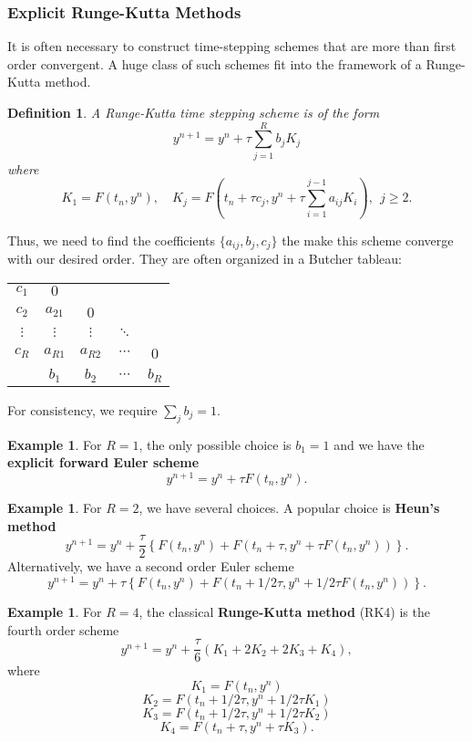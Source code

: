 \documentclass{article}
\newtheorem{definition}[theorem]{Definition}
\theoremstyle{definition}
\newtheorem{example}[theorem]{Example}
\theoremstyle{definition}
\begin{document}
\subsubsection{Explicit Runge-Kutta Methods}
It is often necessary to construct time-stepping schemes that are more than first order convergent. A huge class of such schemes fit into the framework of a Runge-Kutta method.
\begin{definition}
    A Runge-Kutta time stepping scheme is of the form
    $$y^{n+1}=y^n+\tau \sum_{j=1}^{R}b_jK_j$$
    where
    $$K_1=F(t_n,y^n),\quad K_{j}=F\left(t_n+\tau c_j,y^n+\tau\sum_{i=1}^{j-1}a_{ij}K_i\right),\:\:j\geq 2.$$
\end{definition}
Thus, we need to find the coefficients $\{a_{ij},b_j,c_j\}$ the make this scheme converge with our desired order. They are often organized in a Butcher tableau:
\begin{table}[h]
\centering
\begin{tabular}{c|cccc}
$c_1$ & $0$ &  &  &  \\
$c_2$ & $a_{21}$ & 0 &  &  \\
$\vdots$ & $\vdots$ & $\vdots$ & $\ddots$ & \\
$c_R$ & $a_{R1}$ & $a_{R2}$ & $\cdots$ & 0 \\
\hline
      & $b_1$    & $b_2$    & $\cdots$ & $b_R$
\end{tabular}
\end{table}
For consistency, we require $\sum_{j}b_j=1$.
\begin{example}
    For $R=1$, the only possible choice is $b_1=1$ and we have the \textbf{explicit forward Euler scheme}
    $$y^{n+1}=y^n+\tau F(t_n,y^n).$$
\end{example}
\begin{example}
    For $R=2$, we have several choices. A popular choice is \textbf{Heun's method}
    $$y^{n+1}=y^n+\frac{\tau}{2}\left\{F(t_n,y^n)+F(t_n+\tau,y^n+\tau F(t_n,y^n))\right\}.$$
    Alternatively, we have a second order Euler scheme
    $$y^{n+1}=y^n+\tau\left\{F(t_n,y^n)+F(t_n+1/2\tau,y^n+1/2\tau F(t_n,y^n))\right\}.$$
\end{example}
\begin{example}
    For $R=4$, the classical \textbf{Runge-Kutta method} (RK4) is the fourth order scheme
    $$y^{n+1}=y^n+\frac{\tau}{6}(K_1+2K_2+2K_3+K_4),$$
    where
    $$K_1=F(t_n,y^n)$$
    $$K_2=F(t_n+1/2\tau,y^n+1/2\tau K_1)$$
    $$K_3=F(t_n+1/2\tau, y^n+1/2\tau K_2)$$
    $$K_4=F(t_n+\tau,y^n+\tau K_3).$$
\end{example}
\end{document}
